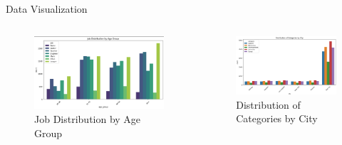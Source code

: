 \documentclass{beamer}
\begin{document}
\begin{frame}{Data Visualization}
    \begin{columns} %
        \begin{column}{0.5\textwidth}
            \begin{figure}
                \centering
                \includegraphics[width=1\textwidth]{images/jog_age.png} %
                \caption{Job Distribution by Age Group}
            \end{figure}
        \end{column}
        
        \begin{column}{0.5\textwidth}
            \begin{figure}
                \centering
                \includegraphics[width=1\textwidth]{images/city.png} %
                \caption{Distribution of Categories by City}
            \end{figure}
        \end{column}
    \end{columns}
\end{frame}
\end{document}
